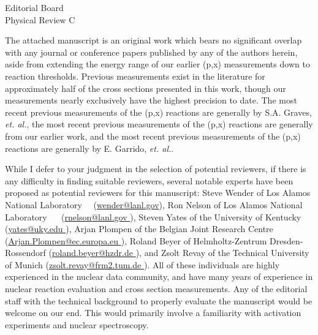 \documentclass{letter} %
\begin{document}
\begin{letter}{
Editorial Board \\
Physical Review C}
 
\noindent The attached manuscript is an original work which bears no significant overlap with any journal or conference papers published by any of the authors herein, aside from extending the energy range of our earlier (p,x) measurements  down to reaction thresholds\footnotemark[9]. 
Previous measurements exist in the literature for approximately half of the cross sections presented in this work, though our measurements nearly exclusively have the highest precision to date.
The   most recent previous measurements of the (p,x) reactions are generally by S.A. Graves, \emph{et. al.}\footnotemark[11], the most recent previous measurements of the (p,x) reactions are generally from our earlier work\footnotemark[10], and the most recent previous measurements of the (p,x) reactions are generally by E. Garrido, \emph{et. al.}\footnotemark[12].

While I defer to your judgment in the selection of potential reviewers, if there is any difficulty in finding suitable reviewers, several notable experts have been proposed as potential reviewers for this manuscript: 
Steve Wender of Los Alamos National Laboratory  (\url{wender@lanl.gov}), Ron Nelson of Los Alamos National Laboratory  	   (\url{rnelson@lanl.gov	}), Steven Yates of the University of Kentucky	  (\url{yates@uky.edu	}), Arjan Plompen of the Belgian Joint Research Centre	   (\url{Arjan.Plompen@ec.europa.eu	}), Roland Beyer of Helmholtz-Zentrum Dresden-Rossendorf	  (\url{roland.beyer@hzdr.de	}), and Zsolt Revay of the Technical University of Munich	  (\url{zsolt.revay@frm2.tum.de	}).  All of these individuals are highly experienced in the nuclear data community, and have many years of experience in nuclear reaction evaluation and cross section measurements.
% 
Any of the editorial staff with the technical background to properly evaluate the manuscript would be welcome on our end.  This would primarily involve a familiarity with activation experiments and nuclear spectroscopy. 


\end{letter}
\end{document}
